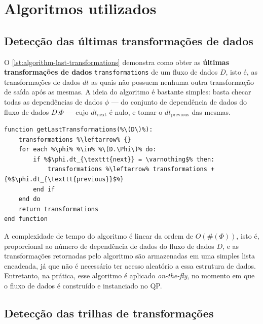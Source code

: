 \section{Algoritmos utilizados}

\subsection{Detecção das últimas transformações de dados}

O \autoref{lst:algorithm-last-transformations} demonstra como obter as \textbf{últimas transformações de dados} \texttt{transformations} de um fluxo de dados \( D \), isto é, as transformações de dados \(dt\) as quais não possuem nenhuma outra transformação de saída após as mesmas. A ideia do algoritmo é bastante simples: basta checar todas as dependências de dados \( \phi \) --- do conjunto de dependência de dados do fluxo de dados \( D.\Phi \) --- cujo \( dt_{\textrm{next}} \) é nulo, e tomar o \( dt_{\textrm{previous}} \) das mesmas.

\begin{minipage}[c]{0.95\textwidth}
\begin{lstlisting}[language=pseudocode,label={lst:algorithm-last-transformations},caption={[Detecção das últimas transformações de dados]Detecção das útimas transformações de dados em uma especificação de fluxo de dados.}]
function getLastTransformations(%\(D\)%):
    transformations %\leftarrow% {}
    for each %\phi% %\in% %\(D.\Phi\)% do:
        if %$\phi.dt_{\texttt{next}} = \varnothing$% then:
            transformations %\leftarrow% transformations + {%$\phi.dt_{\texttt{previous}}$%}
        end if
    end do
    return transformations
end function
\end{lstlisting}
\end{minipage}

A complexidade de tempo do algoritmo é linear da ordem de \( O(\#(\Phi)) \), isto é, proporcional ao número de dependência de dados do fluxo de dados \( D \), e as transformações retornadas pelo algoritmo são armazenadas em uma simples lista encadeada, já que não é necessário ter acesso aleatório a essa estrutura de dados. Entretanto, na prática, esse algoritmo é aplicado \textit{on-the-fly}, no momento em que o fluxo de dados é construído e instanciado no QP.

\subsection{Detecção das trilhas de transformações}%
\label{subsec:deteccao-das-trilhas-de-transformacoes}

